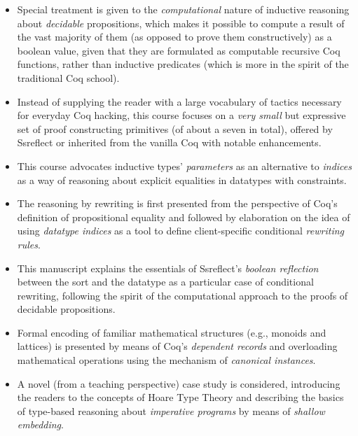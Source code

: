 \begin{itemize}
\item  Special treatment is given to the \textit{computational} nature of inductive reasoning about \textit{decidable} propositions, which makes it possible to compute a result of the vast majority of them (as opposed to prove them constructively) as a boolean value, given that they are formulated as computable recursive Coq functions, rather than inductive predicates (which is more in the spirit of the traditional Coq school).



\item  Instead of supplying the reader with a large vocabulary of tactics necessary for everyday Coq hacking, this course focuses on a \textit{very small} but expressive set of proof constructing primitives (of about a seven in total), offered by Ssreflect or inherited from the vanilla Coq with notable enhancements.



\item  This course advocates inductive types' \textit{parameters} as an alternative to \textit{indices} as a way of reasoning about explicit equalities in datatypes with constraints.



\item  The reasoning by rewriting is first presented from the perspective of Coq's definition of propositional equality and followed by elaboration on the idea of using \textit{datatype indices} as a tool to define client-specific conditional \textit{rewriting rules}.



\item  This manuscript explains the essentials of Ssreflect's \textit{boolean reflection} between the sort  and the datatype  as a particular case of conditional rewriting, following the spirit of the computational approach to the proofs of decidable propositions.



\item  Formal encoding of familiar mathematical structures (e.g., monoids and lattices) is presented by means of Coq's \textit{dependent records} and overloading mathematical operations using the mechanism of \textit{canonical instances}.



\item  A novel (from a teaching perspective) case study is considered, introducing the readers to the concepts of Hoare Type Theory and describing the basics of type-based reasoning about \textit{imperative programs} by means of \textit{shallow embedding}.

\end{itemize}


